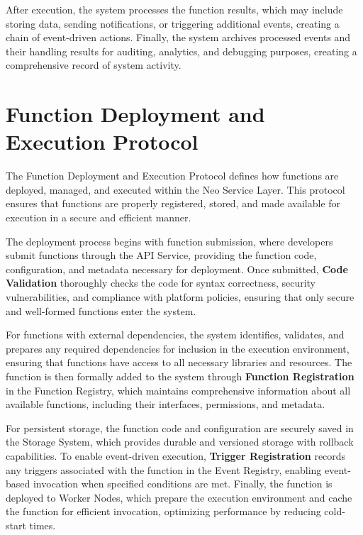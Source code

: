 \documentclass[11pt]{article}
\begin{document}
After execution, the system processes the function results, which may include storing data, sending notifications, or triggering additional events, creating a chain of event-driven actions. Finally, the system archives processed events and their handling results for auditing, analytics, and debugging purposes, creating a comprehensive record of system activity.

\section{Function Deployment and Execution Protocol}
\label{subsec:function-protocol-spec}

The Function Deployment and Execution Protocol defines how functions are deployed, managed, and executed within the Neo Service Layer. This protocol ensures that functions are properly registered, stored, and made available for execution in a secure and efficient manner.


The deployment process begins with function submission, where developers submit functions through the API Service, providing the function code, configuration, and metadata necessary for deployment. Once submitted, \textbf{Code Validation} thoroughly checks the code for syntax correctness, security vulnerabilities, and compliance with platform policies, ensuring that only secure and well-formed functions enter the system.

For functions with external dependencies, the system identifies, validates, and prepares any required dependencies for inclusion in the execution environment, ensuring that functions have access to all necessary libraries and resources. The function is then formally added to the system through \textbf{Function Registration} in the Function Registry, which maintains comprehensive information about all available functions, including their interfaces, permissions, and metadata.

For persistent storage, the function code and configuration are securely saved in the Storage System, which provides durable and versioned storage with rollback capabilities. To enable event-driven execution, \textbf{Trigger Registration} records any triggers associated with the function in the Event Registry, enabling event-based invocation when specified conditions are met. Finally, the function is deployed to Worker Nodes, which prepare the execution environment and cache the function for efficient invocation, optimizing performance by reducing cold-start times.
\end{document}
